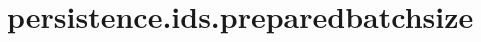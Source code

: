 \section{persistence.ids.preparedbatchsize}
\label{configuration:PersistenceIdsPreparedbatchsize}
\TODO
